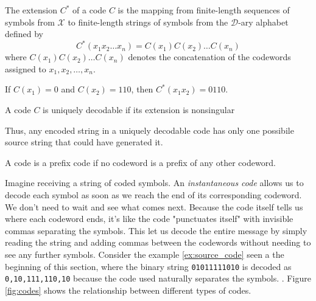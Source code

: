 \begin{definition}\label{def:extension_code}
    The extension $C^*$ of a code $C$ is the mapping from finite-length sequences of symbols from $\mathcal{X}$ to finite-length strings of symbols from the $\mathcal{D}$-ary alphabet defined by
    \begin{equation}
        C^*(x_1x_2\ldots x_n) = C(x_1)C(x_2)\ldots C(x_n)
    \end{equation}
    where $C(x_1)C(x_2)\ldots C(x_n)$ denotes the concatenation of the codewords assigned to $x_1, x_2, \ldots, x_n$.
\end{definition}

\begin{example}
    If $C(x_1) = 0$ and $C(x_2) = 110$, then $C^*(x_1x_2) = 0110$.
\end{example}

\begin{definition}\label{def:unique_decodability}
    A code $C$ is uniquely decodable if its extension is nonsingular
\end{definition}

\noindent Thus, any encoded string in a uniquely decodable code has only one possibile source string that could have generated it.

\begin{definition}\label{def:prefix_code}
    A  code is a prefix code if no codeword is a prefix of any other codeword.
\end{definition}

\noindent Imagine receiving a string of coded symbols. An \emph{instantaneous code} allows us to decode each symbol as soon as we reach the end of its corresponding codeword. We don't need to wait and see what comes next. Because the code itself tells us where each codeword ends, it's like the code "punctuates itself" with invisible commas separating the symbols.  This let us decode the entire message by simply reading the string and adding commas between the codewords without needing to see any further symbols. Consider the example \ref{ex:source_code} seen a the beginning of this section, where the binary string \texttt{01011111010} is decoded as \texttt{0,10,111,110,10} because the code used naturally separates the symbols. \cite{ElementsofInformationTheory}. Figure \ref{fig:codes} shows the relationship between different types of codes.


